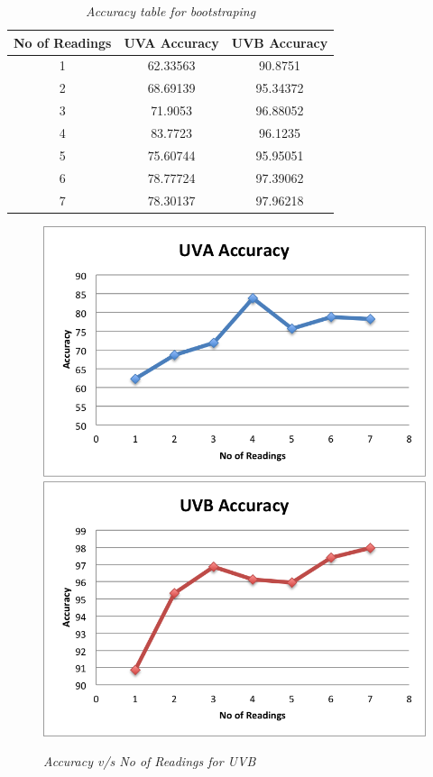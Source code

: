 \documentclass[12pt,fullpage,doublespace]{article}
\begin{document}
\newpage
\begin{table}
\centering
\begin{tabular}{|c|c|c|}
\hline
No of Readings & UVA Accuracy & UVB Accuracy \\
\hline 
1 & 62.33563 & 90.8751\\
\hline
2 & 68.69139 & 95.34372\\
\hline
3 & 71.9053 & 96.88052\\
\hline
4 & 83.7723 & 96.1235\\
\hline
5 & 75.60744 & 95.95051\\
\hline
6 & 78.77724 & 97.39062\\
\hline
7 & 78.30137 & 97.96218\\
\hline
\end{tabular}
\caption{\small \sl Accuracy table for bootstraping}\label{seg2accuracy}
\end{table}


\begin{figure}
\begin{center}
\includegraphics[scale=0.5]{segment2uva.png}
\includegraphics[scale=0.5]{segment2uvb.png}
\caption{\small \sl Accuracy v/s No of Readings for UVB}
\label{fig:lessReadings}
\end{center}
\end{figure}
\end{document}
